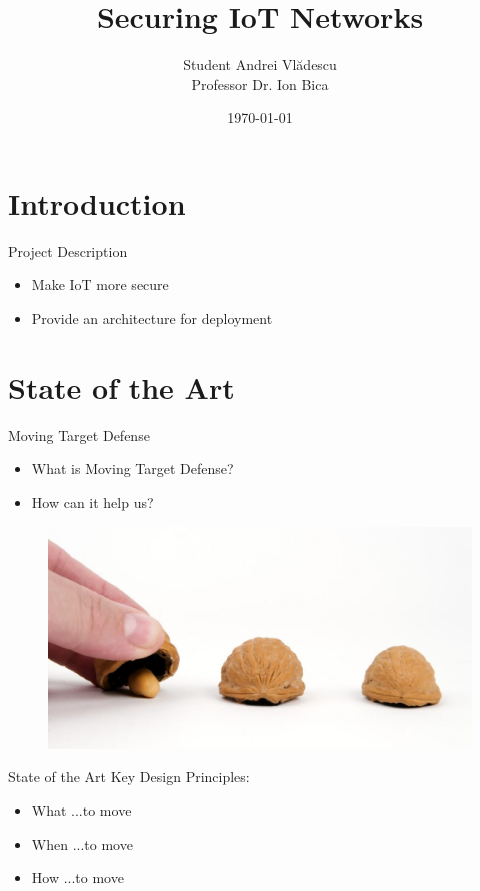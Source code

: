 \documentclass{beamer}
\title{Securing IoT Networks}
\author{Student Andrei Vlădescu \\ Professor Dr. Ion Bica}
\institute{UNIVERSITY POLITEHNICA OF BUCHAREST}
\date{\today}
\begin{document}
\begin{frame}
\titlepage 

\end{frame}

\section{Introduction}

\begin{frame}{Project Description}
    \begin{itemize}
        \item Make IoT more secure
        \item Provide an architecture for deployment
    \end{itemize}
    

\end{frame}

\section{State of the Art}

\begin{frame}{Moving Target Defense}
\begin{itemize}
    \item What is Moving Target Defense? 
    \item How can it help us?
\end{itemize}
    
    \begin{figure}
        \centering
        \includegraphics[width=0.55\linewidth]{img/shell.jpg}
        
        \label{fig:enter-label}
    \end{figure}

\end{frame}


\begin{frame}{State of the Art}
    Key Design Principles:
    \begin{itemize}
        \item What ...to move
        \item When ...to move
        \item How ...to move
    \end{itemize}
\end{frame}
\end{document}
